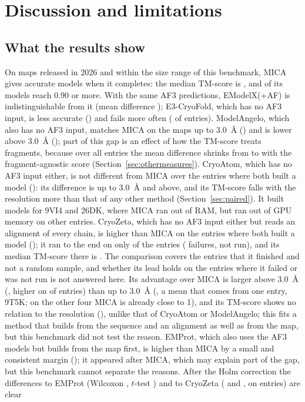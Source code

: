 \section{Discussion and limitations}\label{sec:limits}

\subsection{What the results show}
On maps released in 2026 and within the size range of this benchmark, MICA gives accurate models when it completes: the median TM-score is \TmMedMica{}, and \NTmGeNinetyMica{} of its \NModelMica{} models reach 0.90 or more. With the same AF3 predictions, EModelX(+AF) is indistinguishable from it (mean difference \DiffTmEmodelx{}); E3-CryoFold, which has no AF3 input, is less accurate (\DiffTmEthree{}) and fails more often (\NFailedEthree{} of \NEntries{} entries). ModelAngelo, which also has no AF3 input, matches MICA on the maps up to 3.0~\AA{} (\DiffTmAngeloLow{}) and is lower above 3.0~\AA{} (\DiffTmAngeloHigh{}); part of this gap is an effect of how the TM-score treats fragments, because over all entries the mean difference shrinks from \DiffTmAngelo{} to \DiffFnsAngelo{} with the fragment-agnostic score (Section~\ref{sec:othermeasures}). CryoAtom, which has no AF3 input either, is not different from MICA over the \NPairsTmCryoatom{} entries where both built a model (\DiffTmCryoatom{}): its difference is \DiffTmCryoatomLow{} up to 3.0~\AA{} and \DiffTmCryoatomHigh{} above, and its TM-score falls with the resolution more than that of any other method (Section~\ref{sec:paired}). It built models for 9VI4 and 26DK, where MICA ran out of RAM, but ran out of GPU memory on \NFailedCryoatom{} other entries. CryoZeta, which has no AF3 input either but reads an alignment of every chain, is higher than MICA on the \NPairsTmCryozeta{} entries where both built a model (\DiffTmCryozeta{}); it ran to the end on only \NModelCryozeta{} of the \NEntries{} entries (\NFailedCryozeta{} failures, \NNotRunCryozeta{} not run), and its median TM-score there is \TmMedCryozeta{}. The comparison covers the entries that it finished and not a random sample, and whether its lead holds on the entries where it failed or was not run is not answered here. Its advantage over MICA is larger above 3.0~\AA{} (\DiffTmCryozetaHigh{}, higher on \HigherTmCryozetaHigh{} of \NPairsTmCryozetaHigh{} entries) than up to 3.0~\AA{} (\DiffTmCryozetaLow{}, a mean that comes from one entry, 9T5K; on the other four MICA is already close to 1), and its TM-score shows no relation to the resolution (\RhoResTmCryozeta{}), unlike that of CryoAtom or ModelAngelo; this fits a method that builds from the sequence and an alignment as well as from the map, but this benchmark did not test the reason. EMProt, which also uses the AF3 models but builds from the map first, is higher than MICA by a small and consistent margin (\DiffTmEmprot{}); it appeared after MICA, which may explain part of the gap, but this benchmark cannot separate the reasons. After the Holm correction the differences to EMProt (Wilcoxon \PwHolmTmEmprot{}, $t$-test \PtHolmTmEmprot{}) and to CryoZeta (\PwHolmTmCryozeta{} and \PtHolmTmCryozeta{}, on \NPairsTmCryozeta{} entries) are clear 